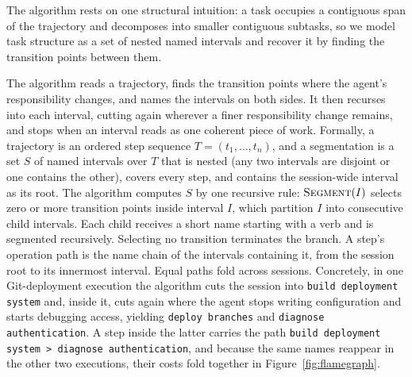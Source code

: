 \documentclass[sigconf,nonacm]{acmart}
\begin{document}
The algorithm rests on one structural intuition: a task occupies
a contiguous span of the trajectory and decomposes into smaller
contiguous subtasks, so we model task structure as a set of nested named intervals and recover it by finding the transition points between them.

The algorithm reads a trajectory, finds the transition points where the agent's responsibility changes, and names the intervals on both sides.
It then recurses into each interval, cutting again wherever a
finer responsibility change remains, and stops when an interval reads as
one coherent piece of work.
Formally, a trajectory is an ordered step sequence $T=(t_1,\dots,t_n)$,
and a segmentation is a set $S$ of named intervals over $T$ that is
nested (any two intervals are disjoint or one contains the other),
covers every step, and contains the session-wide interval as its root.
The algorithm computes $S$ by one recursive rule: $\textsc{Segment}(I)$ selects zero or more transition points inside interval $I$, which partition $I$ into consecutive child intervals. Each child receives a short name starting with a verb and is segmented recursively. Selecting no transition terminates the branch.
A step's operation path is the name chain of the intervals containing it, from the session root to its innermost interval. Equal paths fold across sessions.
Concretely, in one Git-deployment execution the algorithm cuts the session into \texttt{build deployment system} and, inside it, cuts again where the agent stops writing configuration and starts debugging access, yielding \texttt{deploy branches} and \texttt{diagnose authentication}. A step inside the latter carries the path \texttt{build deployment system > diagnose authentication}, and because the same names reappear in the other two executions, their costs fold together in Figure~\ref{fig:flamegraph}.
\end{document}
